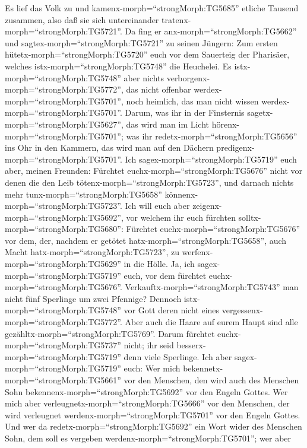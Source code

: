  Es lief das Volk zu und kamenx-morph=``strongMorph:TG5685''
etliche Tausend zusammen, also daß sie sich untereinander
tratenx-morph=``strongMorph:TG5721''. Da fing er
anx-morph=``strongMorph:TG5662'' und sagtex-morph=``strongMorph:TG5721''
zu seinen Jüngern: Zum ersten hütetx-morph=``strongMorph:TG5720'' euch
vor dem Sauerteig der Pharisäer, welches
istx-morph=``strongMorph:TG5748'' die Heuchelei.  Es
istx-morph=``strongMorph:TG5748'' aber nichts
verborgenx-morph=``strongMorph:TG5772'', das nicht offenbar
werdex-morph=``strongMorph:TG5701'', noch heimlich, das man nicht wissen
werdex-morph=``strongMorph:TG5701''.  Darum, was ihr in der
Finsternis sagetx-morph=``strongMorph:TG5627'', das wird man im Licht
hörenx-morph=``strongMorph:TG5701''; was ihr
redetx-morph=``strongMorph:TG5656'' ins Ohr in den Kammern, das wird man
auf den Dächern predigenx-morph=``strongMorph:TG5701''.  Ich
sagex-morph=``strongMorph:TG5719'' euch aber, meinen Freunden: Fürchtet
euchx-morph=``strongMorph:TG5676'' nicht vor denen die den Leib
tötenx-morph=``strongMorph:TG5723'', und darnach nichts mehr
tunx-morph=``strongMorph:TG5658'' könnenx-morph=``strongMorph:TG5723''.
 Ich will euch aber zeigenx-morph=``strongMorph:TG5692'',
vor welchem ihr euch fürchten solltx-morph=``strongMorph:TG5680'':
Fürchtet euchx-morph=``strongMorph:TG5676'' vor dem, der, nachdem er
getötet hatx-morph=``strongMorph:TG5658'', auch Macht
hatx-morph=``strongMorph:TG5723'', zu
werfenx-morph=``strongMorph:TG5629'' in die Hölle. Ja, ich
sagex-morph=``strongMorph:TG5719'' euch, vor dem fürchtet
euchx-morph=``strongMorph:TG5676''. 
Verkauftx-morph=``strongMorph:TG5743'' man nicht fünf Sperlinge um zwei
Pfennige? Dennoch istx-morph=``strongMorph:TG5748'' vor Gott deren nicht
eines vergessenx-morph=``strongMorph:TG5772''.  Aber auch
die Haare auf eurem Haupt sind alle
gezähltx-morph=``strongMorph:TG5769''. Darum fürchtet
euchx-morph=``strongMorph:TG5737'' nicht; ihr seid
besserx-morph=``strongMorph:TG5719'' denn viele Sperlinge. 
Ich aber sagex-morph=``strongMorph:TG5719'' euch: Wer mich
bekennetx-morph=``strongMorph:TG5661'' vor den Menschen, den wird auch
des Menschen Sohn bekennenx-morph=``strongMorph:TG5692'' vor den Engeln
Gottes.  Wer mich aber
verleugnetx-morph=``strongMorph:TG5666'' vor den Menschen, der wird
verleugnet werdenx-morph=``strongMorph:TG5701'' vor den Engeln Gottes.
 Und wer da redetx-morph=``strongMorph:TG5692'' ein Wort
wider des Menschen Sohn, dem soll es vergeben
werdenx-morph=``strongMorph:TG5701''; wer aber
